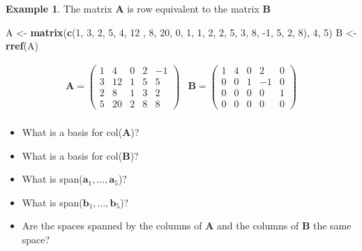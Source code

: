 \documentclass[
]{book}
\newenvironment{Shaded}{\begin{snugshade}}{\end{snugshade}}
\newcommand{\DecValTok}[1]{\textcolor[rgb]{0.00,0.00,0.81}{#1}}
\newcommand{\KeywordTok}[1]{\textcolor[rgb]{0.13,0.29,0.53}{\textbf{#1}}}
\newcommand{\NormalTok}[1]{#1}
\newcommand{\StringTok}[1]{\textcolor[rgb]{0.31,0.60,0.02}{#1}}
\theoremstyle{definition}
\theoremstyle{definition}
\newtheorem{example}{Example}[chapter]
\theoremstyle{definition}
\theoremstyle{definition}
\theoremstyle{remark}
\begin{document}
\begin{example}

The matrix \(\mathbf{A}\) is row equivalent to the matrix \(\mathbf{B}\)

\begin{Shaded}
\begin{Highlighting}[]
\NormalTok{A <-}\StringTok{ }\KeywordTok{matrix}\NormalTok{(}\KeywordTok{c}\NormalTok{(}\DecValTok{1}\NormalTok{, }\DecValTok{3}\NormalTok{, }\DecValTok{2}\NormalTok{, }\DecValTok{5}\NormalTok{, }\DecValTok{4}\NormalTok{, }\DecValTok{12}\NormalTok{ , }\DecValTok{8}\NormalTok{, }\DecValTok{20}\NormalTok{, }\DecValTok{0}\NormalTok{, }\DecValTok{1}\NormalTok{, }\DecValTok{1}\NormalTok{, }\DecValTok{2}\NormalTok{, }\DecValTok{2}\NormalTok{, }\DecValTok{5}\NormalTok{, }\DecValTok{3}\NormalTok{, }\DecValTok{8}\NormalTok{, }\DecValTok{-1}\NormalTok{, }\DecValTok{5}\NormalTok{, }\DecValTok{2}\NormalTok{, }\DecValTok{8}\NormalTok{), }\DecValTok{4}\NormalTok{, }\DecValTok{5}\NormalTok{)}
\NormalTok{B <-}\StringTok{ }\KeywordTok{rref}\NormalTok{(A)}
\end{Highlighting}
\end{Shaded}

\[
\begin{aligned}
\mathbf{A} = \begin{pmatrix} 1 & 4 & 0 & 2 & -1 \\ 3 & 12 & 1 & 5 & 5 \\ 2 & 8 & 1 & 3 & 2 \\ 5 & 20 & 2 & 8 & 8 \end{pmatrix} & \mathbf{B} = \begin{pmatrix} 1 & 4 & 0 & 2 & 0 \\ 0 & 0 & 1 & -1 & 0 \\ 0 & 0 & 0 & 0 & 1 \\ 0 & 0 & 0 & 0 & 0 \end{pmatrix} \\
\end{aligned}
\]

\begin{itemize}
\item
  What is a basis for col(\(\mathbf{A}\))?
\item
  What is a basis for col(\(\mathbf{B}\))?
\item
  What is span(\(\mathbf{a}_1, \ldots, \mathbf{a}_5\))?
\item
  What is span(\(\mathbf{b}_1, \ldots, \mathbf{b}_5\))?
\item
  Are the spaces spanned by the columns of \(\mathbf{A}\) and the columns of \(\mathbf{B}\) the same space?
\end{itemize}

\end{example}
\end{document}

